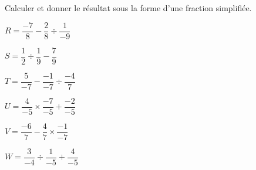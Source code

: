 \begin{exercice*}
    Calculer et donner le résultat sous la forme d'une fraction simplifiée.
        \begin{list}{}{}
            \begin{spacing}{2}
                \item $R = \dfrac{-7}{8} - \dfrac{2}{8}  \div  \dfrac{1}{-9}$
                \item $S = \dfrac{1}{2}  \div  \dfrac{1}{9} - \dfrac{7}{9}$
                \item $T = \dfrac{5}{-7} - \dfrac{-1}{-7}  \div  \dfrac{-4}{7}$
                \item $U = \dfrac{4}{-5}  \times  \dfrac{-7}{-5} + \dfrac{-2}{-5}$
                \item $V = \dfrac{-6}{7} - \dfrac{4}{7}  \times  \dfrac{-1}{-7}$
                \item $W = \dfrac{3}{-4}  \div  \dfrac{1}{-5} + \dfrac{4}{-5}$
            \end{spacing}
        \end{list}
\end{exercice*}

